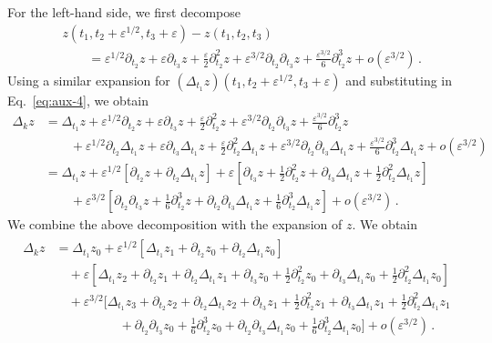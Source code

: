 \documentclass[11pt,english,reqno]{article}
\theoremstyle{plain}
\theoremstyle{definition}
\theoremstyle{remark}
\numberwithin{equation}{section}
\begin{document}
For the left-hand side, we first decompose 
\begin{align*}
    &z(t_1 , t_2 + \varepsilon^{1/2}, t_3 + \varepsilon) - z(t_1, t_2, t_3) \\
    &\qquad= \varepsilon^{1/2} \partial_{t_2} z + \varepsilon \partial_{t_3} z + \frac{\varepsilon}{2} \partial_{t_2}^2 z + \varepsilon^{3/2} \partial_{t_2} \partial_{t_3} z + \frac{\varepsilon^{3/2}}{6} \partial_{t_2}^3 z + o(\varepsilon^{3/2}) \, .
\end{align*}
Using a similar expansion for $(\Delta_{t_1} z)(t_1, t_2 + \varepsilon^{1/2}, t_3 + \varepsilon)$ and substituting in Eq.~\eqref{eq:aux-4}, we obtain
\begin{align*}
    \Delta_k z &= \Delta_{t_1} z + \varepsilon^{1/2} \partial_{t_2} z + \varepsilon \partial_{t_3} z + \frac{\varepsilon}{2} \partial_{t_2}^2 z + \varepsilon^{3/2} \partial_{t_2} \partial_{t_3} z + \frac{\varepsilon^{3/2}}{6} \partial_{t_2}^3 z \\
    &\qquad+ \varepsilon^{1/2} \partial_{t_2} \Delta_{t_1} z + \varepsilon \partial_{t_3} \Delta_{t_1}z + \frac{\varepsilon}{2} \partial_{t_2}^2 \Delta_{t_1}z + \varepsilon^{3/2} \partial_{t_2} \partial_{t_3} \Delta_{t_1}z + \frac{\varepsilon^{3/2}}{6} \partial_{t_2}^3 \Delta_{t_1}z +o(\varepsilon^{3/2}) \\
    &= \Delta_{t_1} z + \varepsilon^{1/2} \left[\partial_{t_2} z + \partial_{t_2} \Delta_{t_1} z\right] + \varepsilon \left[\partial_{t_3} z + \frac{1}{2} \partial_{t_2}^2 z + \partial_{t_3} \Delta_{t_1}z + \frac{1}{2} \partial_{t_2}^2 \Delta_{t_1}z\right] \\
    &\qquad +\varepsilon^{3/2} \left[ \partial_{t_2} \partial_{t_3} z + \frac{1}{6} \partial_{t_2}^3 z +  \partial_{t_2} \partial_{t_3} \Delta_{t_1}z + \frac{1}{6} \partial_{t_2}^3 \Delta_{t_1}z\right]+ o(\varepsilon^{3/2}) \, . 
\end{align*}
We combine the above decomposition with the expansion of $z$. We obtain 
\begin{align*}
    \begin{split}
    \Delta_k z &= \Delta_{t_1} z_0 + \varepsilon^{1/2} \left[\Delta_{t_1} z_1 + \partial_{t_2} z_0 +  \partial_{t_2} \Delta_{t_1}z_0 \right] \\
    &\quad+ \varepsilon \left[\Delta_{t_1} z_2 + \partial_{t_2} z_1 + \partial_{t_2} \Delta_{t_1} z_1 + \partial_{t_3} z_0 + \frac{1}{2} \partial_{t_2}^2 z_0  + \partial_{t_3} \Delta_{t_1} z_0 + \frac{1}{2} \partial_{t_2}^2 \Delta_{t_1} z_0\right] \\
    &\quad+ \varepsilon^{3/2} \bigg[ \Delta_{t_1}z_3 + \partial_{t_2} z_2 + \partial_{t_2} \Delta_{t_1} z_2 + \partial_{t_3} z_1 + \frac{1}{2} \partial_{t_2}^2 z_1 + \partial_{t_3} \Delta_{t_1}z_1 + \frac{1}{2} \partial_{t_2}^2 \Delta_{t_1}z_1 \\
    &\hspace{5em}+  \partial_{t_2} \partial_{t_3} z_0 + \frac{1}{6} \partial_{t_2}^3 z_0 +  \partial_{t_2} \partial_{t_3} \Delta_{t_1}z_0 + \frac{1}{6} \partial_{t_2}^3 \Delta_{t_1}z_0\bigg]+ o(\varepsilon^{3/2}) \, .
    \end{split}
\end{align*}
\end{document}
